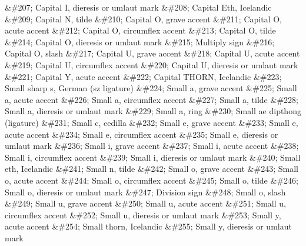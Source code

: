 \&\#207;   Capital I, dieresis or umlaut mark
\&\#208;   Capital Eth, Icelandic
\&\#209;   Capital N, tilde
\&\#210;   Capital O, grave accent
\&\#211;   Capital O, acute accent
\&\#212;   Capital O, circumflex accent
\&\#213;   Capital O, tilde
\&\#214;   Capital O, dieresis or umlaut mark
\&\#215;   Multiply sign
\&\#216;   Capital O, slash
\&\#217;   Capital U, grave accent
\&\#218;   Capital U, acute accent
\&\#219;   Capital U, circumflex accent
\&\#220;   Capital U, dieresis or umlaut mark
\&\#221;   Capital Y, acute accent
\&\#222;   Capital THORN, Icelandic
\&\#223;   Small sharp s, German (sz ligature)
\&\#224;   Small a, grave accent
\&\#225;   Small a, acute accent
\&\#226;   Small a, circumflex accent
\&\#227;   Small a, tilde
\&\#228;   Small a, dieresis or umlaut mark
\&\#229;   Small a, ring
\&\#230;   Small ae dipthong (ligature)
\&\#231;   Small c, cedilla
\&\#232;   Small e, grave accent
\&\#233;   Small e, acute accent
\&\#234;   Small e, circumflex accent
\&\#235;   Small e, dieresis or umlaut mark
\&\#236;   Small i, grave accent
\&\#237;   Small i, acute accent
\&\#238;   Small i, circumflex accent
\&\#239;   Small i, dieresis or umlaut mark
\&\#240;   Small eth, Icelandic
\&\#241;   Small n, tilde
\&\#242;   Small o, grave accent
\&\#243;   Small o, acute accent
\&\#244;   Small o, circumflex accent
\&\#245;   Small o, tilde
\&\#246;   Small o, dieresis or umlaut mark
\&\#247;   Division sign
\&\#248;   Small o, slash
\&\#249;   Small u, grave accent
\&\#250;   Small u, acute accent
\&\#251;   Small u, circumflex accent
\&\#252;   Small u, dieresis or umlaut mark
\&\#253;   Small y, acute accent
\&\#254;   Small thorn, Icelandic
\&\#255;   Small y, dieresis or umlaut mark
